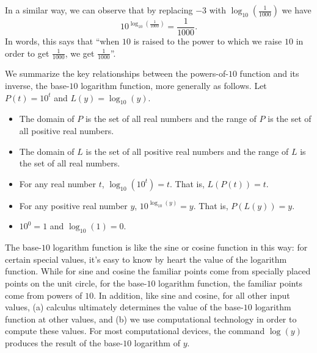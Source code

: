 \documentclass[nooutcomes]{ximera}
\begin{document}
In a similar way, we can observe that by replacing \(-3\) with \(\log_{10}(\frac{1}{1000})\) we have%
\begin{equation}
10^{\log_{10}(\frac{1}{1000})} = \frac{1}{1000}\text{.}\label{eq-exp-log-base-10-minus-3-undo}
\end{equation}
In words, this says that ``when \(10\) is raised to the power to which we raise \(10\) in order to get \(\frac{1}{1000}\), we get \(\frac{1}{1000}\)''.%

We summarize the key relationships between the powers-of-\(10\) function and its inverse, the base-\(10\) logarithm function, more generally as follows. %
Let \(P(t) = 10^t\) and \(L(y) = \log_{10}(y)\).
\begin{itemize}[label=\textbullet]
\item
The domain of \(P\) is the set of all real numbers and the range of \(P\) is the set of all positive real numbers.%
\item
The domain of \(L\) is the set of all positive real numbers and the range of \(L\) is the set of all real numbers.%
\item
For any real number \(t\), \(\log_{10}(10^t) = t\).  That is, \(L(P(t)) = t\).%
\item
For any positive real number \(y\), \(10^{\log_{10}(y)} = y\).  That is, \(P(L(y)) = y\).%
\item
\(10^0 = 1\) and \(\log_{10}(1) = 0\).%
\end{itemize}

The base-\(10\) logarithm function is like the sine or cosine function in this way:  for certain special values, it's easy to know by heart the value of the logarithm function.  While for sine and cosine the familiar points come from specially placed points on the unit circle, for the base-\(10\) logarithm function, the familiar points come from powers of \(10\). In addition, like sine and cosine, for all other input values, (a) calculus ultimately determines the value of the base-\(10\) logarithm function at other values, and (b) we use computational technology in order to compute these values.  For most computational devices, the command $\log(y)$ produces the result of the base-\(10\) logarithm of \(y\).%
\end{document}
